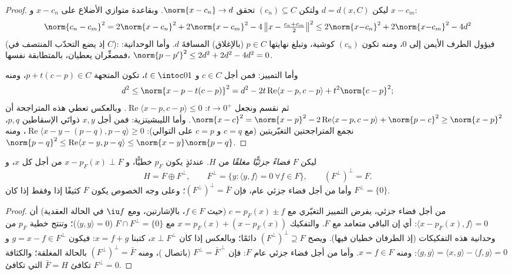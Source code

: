 \begin{proof}
ليكن $d = d(x, C)$ ولتكن $(c_n) \subseteq C$ تحقق $\norm{x - c_n}
\to d$. وبقاعدة متوازي
الأضلاع على $x - c_n$ و $x - c_m$:
\[
\norm{c_n - c_m}^2 = 2\norm{x - c_n}^2 + 2\norm{x - c_m}^2 -
4\,\bigl\|x - \tfrac{c_n + c_m}2\bigr\|^2
\leq 2\norm{x{-}c_n}^2 + 2\norm{x{-}c_m}^2 - 4d^2
\]
(إذ يضع التحدّب المنتصف في $C$): فيؤول الطرف الأيمن إلى $0$،
ومنه تكون $(c_n)$ كوشية، وتبلغ نهايتها $p \in C$ (بالإغلاق)
المسافةَ $d$. وأما الوحدانية: فمصغِّران يعطيان، بالمتطابقة
نفسها، $\norm{p - p'}^2 \leq 2d^2 + 2d^2 - 4d^2 = 0$.

وأما التمييز: فمن أجل $c \in C$ و $t \in \intoc01$، تكون
المتجهة $p + t(c - p) \in C$، ومنه
\[
d^2 \leq \norm{x - p - t(c-p)}^2
= d^2 - 2t\operatorname{Re}\langle x - p, c - p\rangle +
t^2\norm{c-p}^2 ;
\]
ثم نقسم ونجعل $t \to 0^+$: $\operatorname{Re}\langle x - p, c -
p\rangle \leq 0$. وبالعكس تعطي هذه المتراجحة
أن $\norm{x -
c}^2 = \norm{x - p}^2 - 2\operatorname{Re}\langle x - p, c -
p\rangle + \norm{p - c}^2 \geq \norm{x-p}^2$. وأما الليبشيتزية: فمن أجل $x, y$ ذواتَي الإسقاطين
$p, q$، نجمع المتراجحتين التغيّريتين (مع $c = q$ و $c = p$ على
التوالي): $\operatorname{Re}\langle x - y - (p - q), p - q\rangle \geq
0$، ومنه $\norm{p - q}^2 \leq \operatorname{Re}\langle x - y, p -
q\rangle \leq \norm{x - y}\norm{p - q}$.
\end{proof}

\begin{theorem}
\label{thm:b3:hilbert:decomposition}
ليكن $F$ \emph{فضاءً جزئيًّا مغلقًا} من $H$. عندئذٍ يكون $p_F$
خطيًّا، و $x - p_F(x) \perp F$ من أجل كل $x$، و
\[
H = F \oplus F^\perp,
\qquad F^\perp = \{y : \langle y, f\rangle = 0\ \forall f\in
F\},
\qquad (F^\perp)^\perp = F .
\]
وأما من أجل فضاء جزئي عام، فإن $(F^\perp)^\perp = \bar F$؛ وعلى وجه الخصوص يكون $F$
كثيفًا إذا وفقط إذا كان $F^\perp = \{0\}$.
\end{theorem}

\begin{proof}
من أجل فضاء جزئي، يفرض التمييز التغيّري مع $c =
p_F(x) \pm f$ (حيث
$f \in F$، بالإشارتين، ومع $\iu f$ في الحالة العقدية) أن
$\langle x - p_F(x), f\rangle = 0$: أي إن الباقي متعامد مع $F$. والتفكيك $x = p_F(x) + (x
- p_F(x))$ مع $F \cap F^\perp = \{0\}$
($\langle y, y
\rangle = 0$)؛ وتنتج خطية $p_F$ من وحدانية هذه التفكيكات (إذ الطرفان
خطيان فيها). ويصح $(F^\perp)
^\perp \supseteq F$ دائمًا؛ وبالعكس إذا كان $x \perp F^\perp$، كتبنا
$x = f + g$: فيكون $g = x - f \in F^\perp$ و $\langle g,
g\rangle = \langle x, g\rangle - \langle f, g\rangle = 0$: ومنه $x
= f \in F$. وأما من أجل
فضاء جزئي عام $F$: فإن $F^\perp = \bar
F^{\,\perp}$ (باتصال )، ومنه
$(F^\perp)^\perp = \bar F$ بالحالة المغلقة؛ والكثافة تكافئ $\bar F = H$ التي تكافئ
$F^\perp = 0$.
\end{proof}

